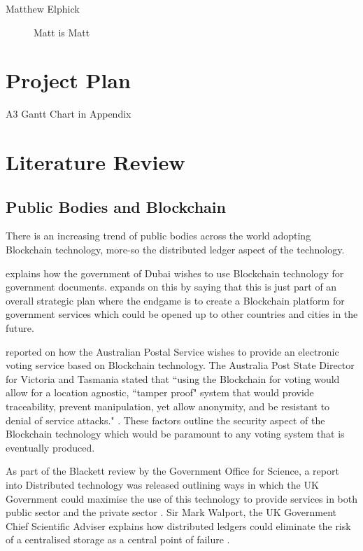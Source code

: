 \documentclass{article}
\begin{document}
\begin{description}

\item[Matthew Elphick] Matt is Matt



\end{description}

\section{Project Plan}
A3 Gantt Chart in Appendix

\section{Literature Review}
\subsection{Public Bodies and Blockchain}
There is an increasing trend of public bodies across the world adopting Blockchain technology, more-so the distributed ledger aspect of the technology.
\par
\textcite{dubaichain} explains how the government of Dubai wishes to use Blockchain technology for government documents. \textcite{dubaichain2} expands on this by saying that this is just part of an overall strategic plan where the endgame is to create a Blockchain platform for government services which could be opened up to other countries and cities in the future. 
\par
\textcite{auzchain} reported on how the Australian Postal Service wishes to provide an electronic voting service based on Blockchain technology. The Australia Post State Director for Victoria and Tasmania stated that ``using the Blockchain for voting would allow for a location agnostic, ``tamper proof" system that would provide traceability, prevent manipulation, yet allow anonymity, and be resistant to denial of service attacks." \parencite{auzchain}. These factors outline the security aspect of the Blockchain technology which would be paramount to any voting system that is eventually produced.
\par
As part of the Blackett review by the Government Office for Science, a report into Distributed technology was released outlining ways in which the UK Government could maximise the use of this technology to provide services in both public sector and the private sector \parencite{ukdlt}. Sir Mark Walport, the UK Government Chief Scientific Adviser explains how distributed ledgers could eliminate the risk of a centralised storage as a central point of failure \parencite{ukdlt2}.
\end{document}

